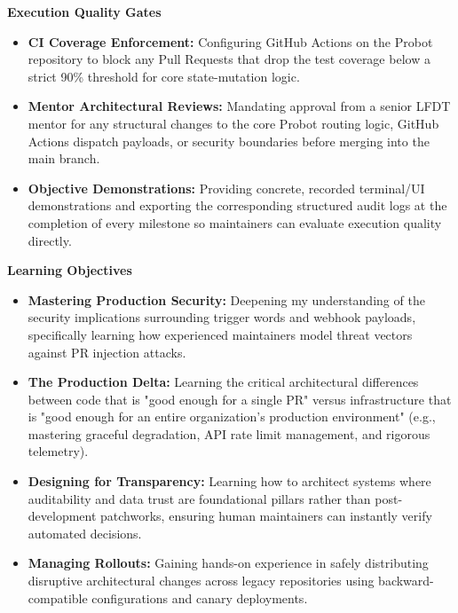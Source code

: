 \documentclass[11pt]{article}
\newcommand{\mainheading}[1]{\par\vspace{10pt}\noindent{\fontsize{15pt}{18pt}\selectfont\textcolor{headingblue}{#1}}
\par\vspace{4pt}}
\begin{document}
\vspace{5pt}
\noindent
\textbf{Execution Quality Gates}
\begin{itemize}[leftmargin=18pt,itemsep=2pt,topsep=2pt]
    \item \textbf{CI Coverage Enforcement:} Configuring GitHub Actions on the Probot repository to block any Pull Requests that drop the test coverage below a strict 90\% threshold for core state-mutation logic.
    \item \textbf{Mentor Architectural Reviews:} Mandating approval from a senior LFDT mentor for any structural changes to the core Probot routing logic, GitHub Actions dispatch payloads, or security boundaries before merging into the main branch.
    \item \textbf{Objective Demonstrations:} Providing concrete, recorded terminal/UI demonstrations and exporting the corresponding structured audit logs at the completion of every milestone so maintainers can evaluate execution quality directly.
\end{itemize}


\mainheading{10. Learning Objectives \& Communication Plan}

\textbf{Learning Objectives}
\begin{itemize}[leftmargin=18pt,itemsep=2pt,topsep=2pt]
    \item \textbf{Mastering Production Security:} Deepening my understanding of the security implications surrounding trigger words and webhook payloads, specifically learning how experienced maintainers model threat vectors against PR injection attacks.
    \item \textbf{The Production Delta:} Learning the critical architectural differences between code that is "good enough for a single PR" versus infrastructure that is "good enough for an entire organization's production environment" (e.g., mastering graceful degradation, API rate limit management, and rigorous telemetry).
    \item \textbf{Designing for Transparency:} Learning how to architect systems where auditability and data trust are foundational pillars rather than post-development patchworks, ensuring human maintainers can instantly verify automated decisions.
    \item \textbf{Managing Rollouts:} Gaining hands-on experience in safely distributing disruptive architectural changes across legacy repositories using backward-compatible configurations and canary deployments.
\end{itemize}
\end{document}

